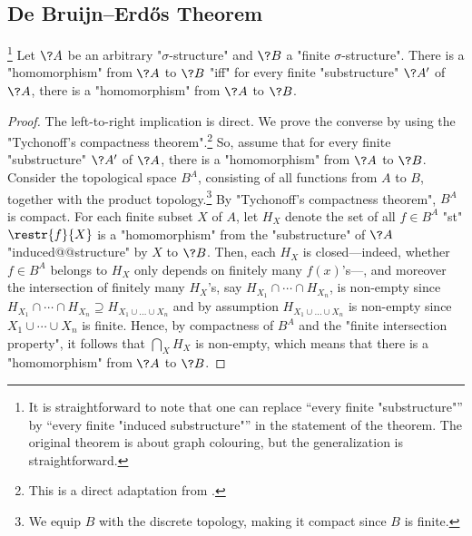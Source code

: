 \subsection{De Bruijn–Erdős Theorem}

\begin{proposition}
	\!\footnote{It is straightforward to note that
	one can replace ``every finite "substructure"'' by
	``every finite "induced substructure"'' in the statement of the theorem.
	The original theorem is about graph colouring, but the generalization is straightforward.}%
	\AP\label{prop:de-bruijn-erdos}
	Let $\?A$ be an arbitrary "$\sigma$-structure" and $\?B$ a "finite $\sigma$-structure".
	There is a "homomorphism" from $\?A$ to $\?B$ "iff" for every finite "substructure" $\?A'$
	of $\?A$, there is a "homomorphism" from $\?A$ to $\?B$.
\end{proposition}

\begin{proof}
	The left-to-right implication is direct.
	We prove the converse by using the "Tychonoff's compactness theorem".\footnote{This is a direct adaptation from \cite[\S~``Proof'']{Wikipedia2024DeBruijnErdos}.}
	So, assume that for every finite "substructure" $\?A'$ of $\?A$,
	there is a "homomorphism" from $\?A$ to $\?B$. 
	Consider the topological space $B^A$, consisting of all functions from $A$ to $B$,
	together with the product topology.\footnote{We equip $B$ with the discrete topology,
	making it compact since $B$ is finite.} By "Tychonoff's compactness theorem",
	$B^A$ is compact. For each finite subset $X$ of $A$, let
	$H_X$ denote the set of all $f \in B^A$ "st" $\restr{f}{X}$ is a "homomorphism"
	from the "substructure" of $\?A$ "induced@@structure" by $X$ to $\?B$.
	Then, each $H_X$ is closed---indeed, whether $f\in B^A$ belongs to $H_X$ only depends
	on finitely many $f(x)$'s---, and moreover the intersection of finitely many
	$H_X$'s, say $H_{X_1} \cap \cdots \cap H_{X_n}$, is non-empty since
	$H_{X_1} \cap \cdots \cap H_{X_n} \supseteq H_{X_1\cup \dotsc \cup X_n}$
	and by assumption $H_{X_1\cup \dotsc \cup X_n}$ is non-empty since $X_1 \cup \cdots \cup X_n$ is finite. Hence, by compactness of $B^A$ and the "finite intersection property", it follows
	that $\bigcap_X H_X$ is non-empty, which means that there is a "homomorphism" from $\?A$ to $\?B$.
\end{proof}

